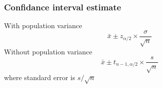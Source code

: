 \documentclass[tiles]{cornellnotes}
\begin{document}
\begin{cuenotes}
{                        \subsubsection*{Confidance interval estimate}
                        With population variance
                        $$\bar{x} \pm z_{\alpha/2} \times \frac{\sigma}{\sqrt{n}}$$
                        Without population variance
                        $$\bar{x} \pm t_{n-1,\alpha/2} \times \frac{s}{\sqrt{n}}$$
                        where standard error is $s/\sqrt{n}$
                }
        \end{cuenotes}
\end{document}
